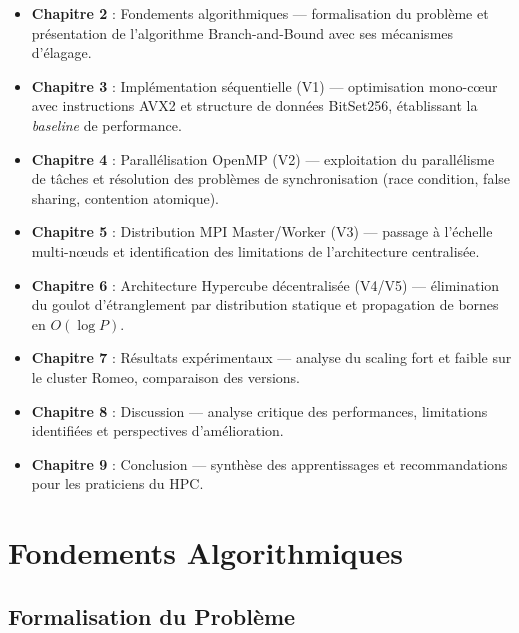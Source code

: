 \documentclass[12pt,a4paper,twoside]{report}
\begin{document}
\begin{itemize}[leftmargin=*]
    \item \textbf{Chapitre 2} : Fondements algorithmiques --- formalisation du problème et présentation de l'algorithme Branch-and-Bound avec ses mécanismes d'élagage.

    \item \textbf{Chapitre 3} : Implémentation séquentielle (V1) --- optimisation mono-cœur avec instructions AVX2 et structure de données BitSet256, établissant la \textit{baseline} de performance.

    \item \textbf{Chapitre 4} : Parallélisation OpenMP (V2) --- exploitation du parallélisme de tâches et résolution des problèmes de synchronisation (race condition, false sharing, contention atomique).

    \item \textbf{Chapitre 5} : Distribution MPI Master/Worker (V3) --- passage à l'échelle multi-nœuds et identification des limitations de l'architecture centralisée.

    \item \textbf{Chapitre 6} : Architecture Hypercube décentralisée (V4/V5) --- élimination du goulot d'étranglement par distribution statique et propagation de bornes en $O(\log P)$.

    \item \textbf{Chapitre 7} : Résultats expérimentaux --- analyse du scaling fort et faible sur le cluster Romeo, comparaison des versions.

    \item \textbf{Chapitre 8} : Discussion --- analyse critique des performances, limitations identifiées et perspectives d'amélioration.

    \item \textbf{Chapitre 9} : Conclusion --- synthèse des apprentissages et recommandations pour les praticiens du HPC.
\end{itemize}


\chapter{Fondements Algorithmiques}

\section{Formalisation du Problème}
\end{document}
